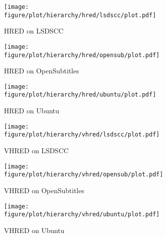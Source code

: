 \begin{figure}
    \centering
    \begin{subfigure}{0.33\linewidth}
        \centering
        \texttt{[image: figure/plot/hierarchy/hred/lsdscc/plot.pdf]}
        \caption{HRED on LSDSCC}
    \end{subfigure}%
    \begin{subfigure}{0.33\linewidth}
        \centering
        \texttt{[image: figure/plot/hierarchy/hred/opensub/plot.pdf]}
        \caption{HRED on OpenSubtitles}
    \end{subfigure}%
    \begin{subfigure}{0.33\linewidth}
        \centering
        \texttt{[image: figure/plot/hierarchy/hred/ubuntu/plot.pdf]}
        \caption{HRED on Ubuntu}
    \end{subfigure}
    \begin{subfigure}{0.33\linewidth}
        \centering
        \texttt{[image: figure/plot/hierarchy/vhred/lsdscc/plot.pdf]}
        \caption{VHRED on LSDSCC}
    \end{subfigure}%
    \begin{subfigure}{0.33\linewidth}
        \centering
        \texttt{[image: figure/plot/hierarchy/vhred/opensub/plot.pdf]}
        \caption{VHRED on OpenSubtitles}
    \end{subfigure}%
    \begin{subfigure}{0.33\linewidth}
        \centering
        \texttt{[image: figure/plot/hierarchy/vhred/ubuntu/plot.pdf]}
        \caption{VHRED on Ubuntu}
    \end{subfigure}
    \caption{}
    \label{fig:hierarchy}
\end{figure}
